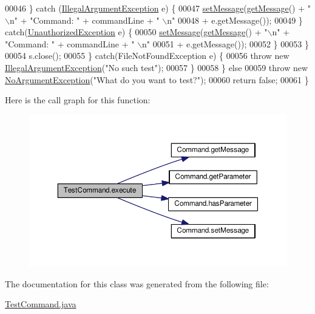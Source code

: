 \begin{DoxyCode}
00046                     \} \textcolor{keywordflow}{catch} (\hyperlink{classIllegalArgumentException}{IllegalArgumentException} e) \{
00047                         \hyperlink{classCommand_a715709d8f0ab65879d79ad1725c96f17}{setMessage}(\hyperlink{classCommand_ac3d4abebefb2aea0ce9757bf9c356882}{getMessage}() + \textcolor{stringliteral}{"\(\backslash\)n"} + \textcolor{stringliteral}{"Command: "} + commandLine + \textcolor{stringliteral}{"
      \(\backslash\)n"}
00048                                 + e.getMessage());
00049                     \} \textcolor{keywordflow}{catch}(\hyperlink{classUnauthorizedException}{UnauthorizedException} e)  \{
00050                         \hyperlink{classCommand_a715709d8f0ab65879d79ad1725c96f17}{setMessage}(\hyperlink{classCommand_ac3d4abebefb2aea0ce9757bf9c356882}{getMessage}() + \textcolor{stringliteral}{"\(\backslash\)n"} + \textcolor{stringliteral}{"Command: "} + commandLine + \textcolor{stringliteral}{"
      \(\backslash\)n"}
00051                                 + e.getMessage());
00052                     \}
00053                 \}
00054                 s.close();
00055             \} \textcolor{keywordflow}{catch}(FileNotFoundException e) \{
00056                 \textcolor{keywordflow}{throw} \textcolor{keyword}{new} \hyperlink{classIllegalArgumentException}{IllegalArgumentException}(\textcolor{stringliteral}{"No such test"});
00057             \}
00058         \} \textcolor{keywordflow}{else}
00059             \textcolor{keywordflow}{throw} \textcolor{keyword}{new} \hyperlink{classNoArgumentException}{NoArgumentException}(\textcolor{stringliteral}{"What do you want to test?"});
00060         \textcolor{keywordflow}{return} \textcolor{keyword}{false};
00061     \}
\end{DoxyCode}


Here is the call graph for this function\-:
\nopagebreak
\begin{figure}[H]
\begin{center}
\leavevmode
\includegraphics[width=350pt]{classTestCommand_a2c5d98451d5cedb9297caae17378de63_cgraph}
\end{center}
\end{figure}




The documentation for this class was generated from the following file\-:\begin{DoxyCompactItemize}
\item 
\hyperlink{TestCommand_8java}{Test\-Command.\-java}\end{DoxyCompactItemize}

